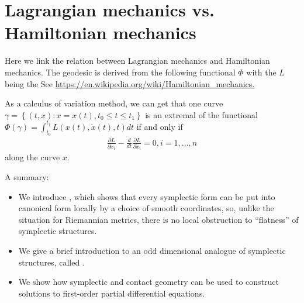 \documentclass{article}
\begin{document}
 
 \section{Lagrangian mechanics vs. Hamiltonian mechanics}
Here we link the relation between Lagrangian mechanics and Hamiltonian mechanics. The geodesic is derived from the following functional $\Phi$ with the $L$ being the 
See \url{https://en.wikipedia.org/wiki/Hamiltonian_mechanics.} 

As a calculus of variation method, we can get that one curve $\gamma=\left\{(t, x): x=x(t), t_0 \leq t \leq t_1\right\}$ is an extremal of the functional $\Phi(\gamma)=\int_{t_0}^{t_1} L(x(t), \dot{x}(t), t) d t$ if and only if
\begin{align*}
\frac{\partial L}{\partial x_i}-\frac{d}{d t} \frac{\partial L}{\partial \dot{x}_i}=0, i=1, \ldots, n
\end{align*}
along the curve $x$.

\appendix
A summary:
\begin{itemize}[$\blacktriangleright$]
\item We introduce , which shows that every symplectic form can be put into canonical form locally by a choice of smooth coordinates, so, unlike the situation for Riemannian metrics, there is no local obstruction to ``flatness'' of symplectic structures.
\item We give a brief introduction to an odd dimensional analogue of symplectic structures, called .
\item We show how symplectic and contact geometry can be used to construct solutions to first-order partial differential equations.
\end{itemize} 



\end{document}
